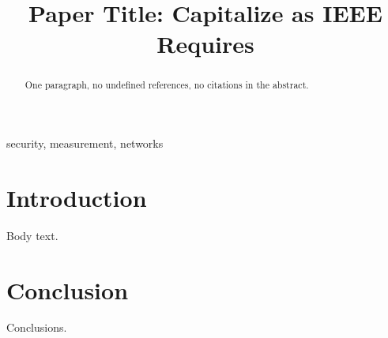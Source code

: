 \documentclass[conference,compsoc]{IEEEtran}
\begin{document}
\title{Paper Title: Capitalize as IEEE Requires}

\author{
}

\maketitle

\begin{abstract}
One paragraph, no undefined references, no citations in the abstract.
\end{abstract}

\begin{IEEEkeywords}
security, measurement, networks
\end{IEEEkeywords}

\section{Introduction}
Body text.

\section{Conclusion}
Conclusions.



\end{document}
